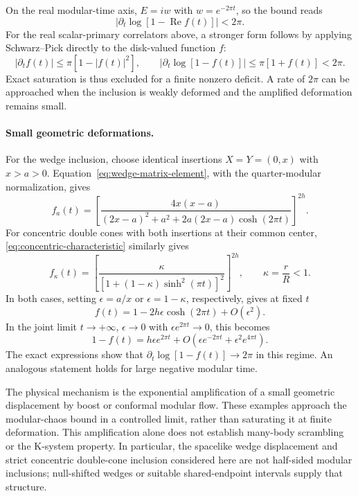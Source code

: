 \documentclass[a4paper,11pt]{article}
\theoremstyle{definition}
\begin{document}
On the real modular-time axis, $E=iw$ with $w=e^{-2\pi t}$, so the bound reads
\[
 \left|\partial_t\log[1-\operatorname{Re}f(t)]\right|<2\pi.
\]
For the real scalar-primary correlators above, a stronger form follows by applying Schwarz--Pick directly to the disk-valued function $f$:
\begin{equation}
 |\partial_t f(t)|\leq\pi[1-|f(t)|^2],\qquad
 \left|\partial_t\log[1-f(t)]\right|\leq\pi[1+f(t)]<2\pi.
 \label{eq:real-axis-modular-chaos-bound}
\end{equation}
Exact saturation is thus excluded for a finite nonzero deficit. A rate of $2\pi$ can be approached when the inclusion is weakly deformed and the amplified deformation remains small.

\paragraph{Small geometric deformations.}
For the wedge inclusion, choose identical insertions $X=Y=(0,x)$ with $x>a>0$. Equation~\eqref{eq:wedge-matrix-element}, with the quarter-modular normalization, gives
\begin{equation}
 f_a(t)=\left[
 \frac{4x(x-a)}{(2x-a)^2+a^2+2a(2x-a)\cosh(2\pi t)}
 \right]^{2h}.
 \label{eq:normalized-small-wedge}
\end{equation}
For concentric double cones with both insertions at their common center, \eqref{eq:concentric-characteristic} similarly gives
\begin{equation}
 f_\kappa(t)=\left[
 \frac{\kappa}{[1+(1-\kappa)\sinh^2(\pi t)]^2}
 \right]^{2h},\qquad \kappa=\frac rR<1.
 \label{eq:normalized-small-cones}
\end{equation}
In both cases, setting $\epsilon=a/x$ or $\epsilon=1-\kappa$, respectively, gives at fixed $t$
\begin{equation}
 f(t)=1-2h\epsilon\cosh(2\pi t)+O(\epsilon^2).
 \label{eq:small-deformation-expansion}
\end{equation}
In the joint limit $t\to+\infty$, $\epsilon\to0$ with $\epsilon e^{2\pi t}\to0$, this becomes
\begin{equation}
 1-f(t)=h\epsilon e^{2\pi t}
 +O\!\left(\epsilon e^{-2\pi t}+\epsilon^2e^{4\pi t}\right).
 \label{eq:asymptotic-saturation}
\end{equation}
The exact expressions show that $\partial_t\log[1-f(t)]\to2\pi$ in this regime. An analogous statement holds for large negative modular time.

The physical mechanism is the exponential amplification of a small geometric displacement by boost or conformal modular flow. These examples approach the modular-chaos bound in a controlled limit, rather than saturating it at finite deformation. This amplification alone does not establish many-body scrambling or the K-system property. In particular, the spacelike wedge displacement and strict concentric double-cone inclusion considered here are not half-sided modular inclusions; null-shifted wedges or suitable shared-endpoint intervals supply that structure.
\end{document}
